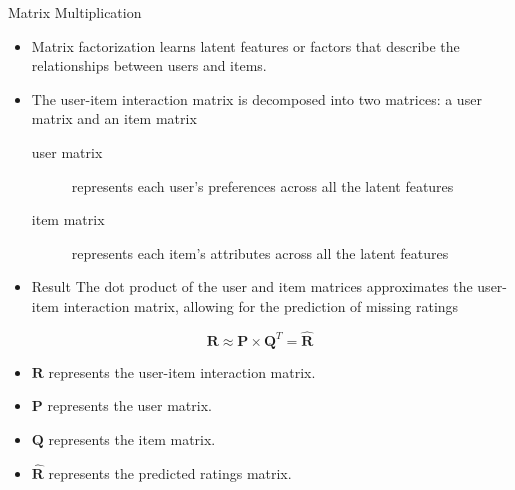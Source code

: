 \documentclass[aspectratio=169]{../latex_main/tntbeamer}  %
\begin{document}
    \begin{frame}{Matrix Multiplication}

        \vspace{-1em}
        \begin{itemize}
            \item Matrix factorization learns latent features or factors that describe the relationships between users and items.
            \item The user-item interaction matrix is decomposed into two matrices: a user matrix and an item matrix
            \begin{description}
                \item[user matrix] represents each user's preferences across all the latent features
                \item[item matrix] represents each item's attributes across all the latent features
            \end{description}
            \item \alert{Result} The dot product of the user and item matrices approximates the user-item interaction matrix, allowing for the prediction of missing ratings
        \end{itemize}

        $$\mathbf{R} \approx \mathbf{P} \times \mathbf{Q}^T = \hat{\mathbf{R}}$$

        \begin{itemize}
            \item $\mathbf{R}$ represents the user-item interaction matrix.
            \item $\mathbf{P}$ represents the user matrix.
            \item $\mathbf{Q}$ represents the item matrix.
            \item $\hat{\mathbf{R}}$ represents the predicted ratings matrix.
        \end{itemize}
      
   \end{frame}
\end{document}
